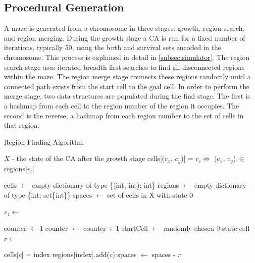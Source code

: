 \subsection{Procedural Generation}
A maze is generated from a chromosome in three stages: growth, region search, and region merging. During the growth stage a CA is run for a fixed number of iterations, typically 50, using the birth and survival sets encoded in the chromosome. This process is explained in detail in \ref{subsec:simulator}. The region search stage uses iterated breadth first searches to find all disconnected regions within the maze. The region merge stage connects these regions randomly until a connected path exists from the start cell to the goal cell. In order to perform the merge stage, two data structures are populated during the find stage. The first is a hashmap from each cell to the region number of the region it occupies. The second is the reverse, a hashmap from each region number to the set of cells in that region.

\begin{algorithm}
  \caption{Region Finding Algorithm}\label{alg:region-find}
  \begin{algorithmic}
  \Require $X$ - the state of the CA after the growth stage
  \Ensure cells[($c_x$, $c_y$)] = $r_c \iff$ ($c_x$, $c_y$) $\in$ regions[$r_c$]

  \State cells $\gets$ empty dictionary of type \{(int, int): int\}
  \State regions $\gets$ empty dictionary of type \{int: set\{int\}\}
  \State spaces $\gets$ set of cells in X with state 0

  \State $r_1 \gets$ 
  \State {}
  
  
  \State counter $\gets 1$
    \State counter $\gets$ counter + 1
    \State startCell $\gets$ randomly chosen 0-state cell
    \State $r \gets$ 
    \State {}
  \EndWhile

        \State cells[$c$] = index
        \State regions[index].add($c$)
    \EndFor
    \State spaces $\gets$ spaces - $r$
  \EndProcedure
  \end{algorithmic}
\end{algorithm}

